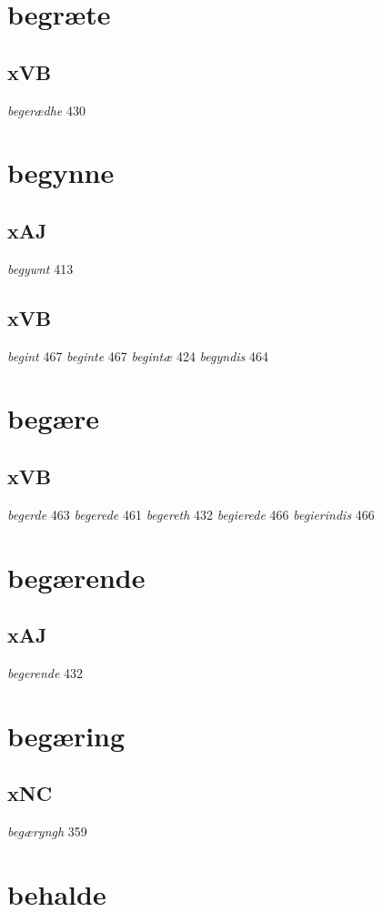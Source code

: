 \documentclass[a4paper,twocolumn]{article}
\begin{document}
\section{begræte}
\label{sec:orgc07b4a9}
\subsection{xVB}
\label{sec:org2168b3d}
\emph{begerædhe} 430 
\section{begynne}
\label{sec:org9c26f95}
\subsection{xAJ}
\label{sec:org22990ce}
\emph{begywnt} 413 
\subsection{xVB}
\label{sec:orge7d83e2}
\emph{begint} 467 \emph{beginte} 467 \emph{begintæ} 424 \emph{begyndis} 464 
\section{begære}
\label{sec:orgfa97362}
\subsection{xVB}
\label{sec:orgc9b8b55}
\emph{begerde} 463 \emph{begerede} 461 \emph{begereth} 432 \emph{begierede} 466 \emph{begierindis} 466 
\section{begærende}
\label{sec:orga4b10f7}
\subsection{xAJ}
\label{sec:org84b80e2}
\emph{begerende} 432 
\section{begæring}
\label{sec:orgf4c268b}
\subsection{xNC}
\label{sec:org3bb4b1c}
\emph{begæryngh} 359 
\section{behalde}
\label{sec:org5592b7b}
\end{document}
